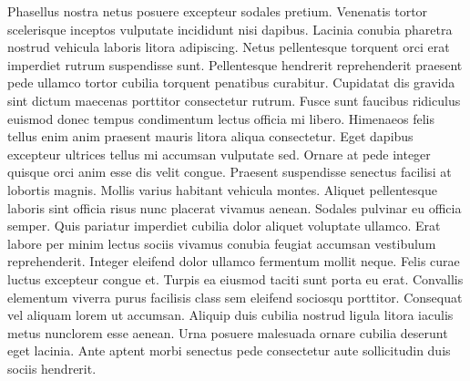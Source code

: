 Phasellus nostra netus posuere excepteur sodales pretium. Venenatis tortor scelerisque inceptos vulputate incididunt nisi dapibus. Lacinia conubia pharetra nostrud vehicula laboris litora adipiscing. Netus pellentesque torquent orci erat imperdiet rutrum suspendisse sunt. Pellentesque hendrerit reprehenderit praesent pede ullamco tortor cubilia torquent penatibus curabitur. Cupidatat dis gravida sint dictum maecenas porttitor consectetur rutrum. Fusce sunt faucibus ridiculus euismod donec tempus condimentum lectus officia mi libero. Himenaeos felis tellus enim anim praesent mauris litora aliqua consectetur. Eget dapibus excepteur ultrices tellus mi accumsan vulputate sed.
Ornare at pede integer quisque orci anim esse dis velit congue. Praesent suspendisse senectus facilisi at lobortis magnis. Mollis varius habitant vehicula montes. Aliquet pellentesque laboris sint officia risus nunc placerat vivamus aenean. Sodales pulvinar eu officia semper. Quis pariatur imperdiet cubilia dolor aliquet voluptate ullamco. Erat labore per minim lectus sociis vivamus conubia feugiat accumsan vestibulum reprehenderit.
Integer eleifend dolor ullamco fermentum mollit neque. Felis curae luctus excepteur congue et. Turpis ea eiusmod taciti sunt porta eu erat. Convallis elementum viverra purus facilisis class sem eleifend sociosqu porttitor. Consequat vel aliquam lorem ut accumsan. Aliquip duis cubilia nostrud ligula litora iaculis metus nunclorem esse aenean. Urna posuere malesuada ornare cubilia deserunt eget lacinia. Ante aptent morbi senectus pede consectetur aute sollicitudin duis sociis hendrerit.

